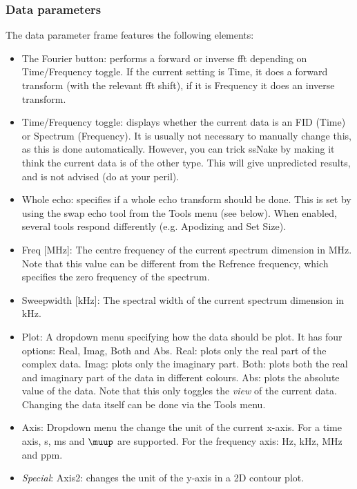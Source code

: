\documentclass[11pt,a4paper]{article}
\begin{document}
\subsubsection*{Data parameters}
The data parameter frame features the following elements:
\begin{itemize}
\item The Fourier button: performs a forward or inverse fft depending on Time/Frequency toggle. If the current setting is Time, it does a forward transform (with the relevant fft shift), if it is Frequency it does an inverse transform.
\item Time/Frequency toggle: displays whether the current data is an FID (Time) or Spectrum (Frequency). It is usually not necessary to manually change this, as this is done automatically. However, you can trick ssNake by making it think the current data is of the other type. This will give unpredicted results, and is not advised (do at your peril).
\item Whole echo: specifies if a whole echo transform should be done. This is set by using the swap echo tool from the Tools menu (see below). When enabled, several tools respond differently (e.g. Apodizing and Set Size).
\item Freq [MHz]: The centre frequency of the current spectrum dimension in MHz. Note that this value can be different from the Refrence frequency, which specifies the zero frequency of the spectrum.
\item Sweepwidth [kHz]: The spectral width of the current spectrum dimension in kHz. 
\item Plot: A dropdown menu specifying how the data should be plot. It has four options: Real, Imag, Both and Abs. Real: plots only the real part of the complex data. Imag: plots only the imaginary part. Both: plots both the real and imaginary part of the data in different colours. Abs: plots the absolute value of the data. Note that this only toggles the \textit{view} of the current data. Changing the data itself can be done via the Tools menu.
\item Axis: Dropdown menu the change the unit of the current x-axis. For a time axis, s, ms and $\muup$ are supported. For the frequency axis: Hz, kHz, MHz and ppm.
\item \textit{Special}: Axis2: changes the unit of the y-axis in a 2D contour plot.
\end{itemize}
\end{document}
